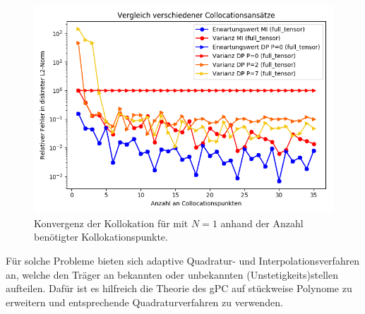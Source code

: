 \begin{figure}[!htb]
\includegraphics[width=\textwidth]{Figures/collocation_midp_trialdisconttriple.png}
\caption{Konvergenz der Kollokation für  mit $N=1$ anhand der Anzahl benötigter Kollokationspunkte.}
\label{fig:Kollokation_comparison_trialdisconttriple}
\end{figure}
Für solche Probleme bieten sich adaptive Quadratur- und Interpolationsverfahren an, welche den Träger an bekannten oder unbekannten (Unstetigkeits)stellen aufteilen. Dafür ist es hilfreich die Theorie des gPC auf stückweise Polynome zu erweitern und entsprechende Quadraturverfahren zu verwenden.

